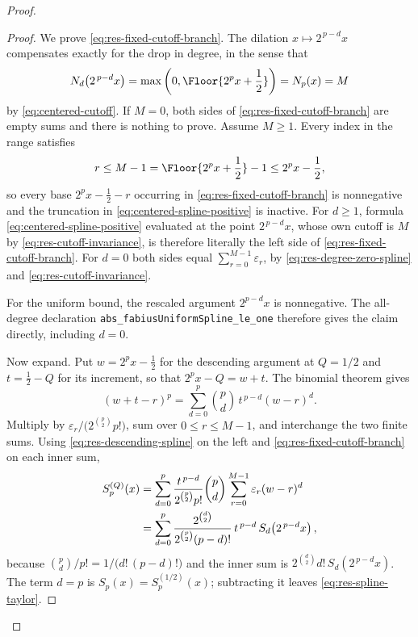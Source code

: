 \documentclass[11pt,oneside]{article}
\theoremstyle{definition}
\theoremstyle{remark}
\newcommand{\lean}[1]{%
  \ifmmode\text{\nolinkurl{#1}}\else\nolinkurl{#1}\fi}
\begin{document}
\begin{proof}
\begin{proof}
We prove \eqref{eq:res-fixed-cutoff-branch}.  The dilation $x\mapsto2^{\,p-d}x$ compensates
exactly for the drop in degree, in the sense that
\begin{equation}
 N_d\!\left(2^{\,p-d}x\right)
 =\max\left(0,\Floor{2^{p}x+\frac12}\right)
 =N_p(x)=M                                                \label{eq:res-cutoff-invariance}
\end{equation}
by \eqref{eq:centered-cutoff}.  If $M=0$, both sides of
\eqref{eq:res-fixed-cutoff-branch} are empty sums and there is nothing to prove.  Assume
$M\ge1$.  Every index in the range satisfies
\[
 r\le M-1=\Floor{2^px+\frac12}-1\le2^px-\frac12,
\]
so every base $2^px-\frac12-r$ occurring in \eqref{eq:res-fixed-cutoff-branch} is
nonnegative and the truncation in \eqref{eq:centered-spline-positive} is inactive.  For
$d\ge1$, formula \eqref{eq:centered-spline-positive} evaluated at the point $2^{\,p-d}x$,
whose own cutoff is $M$ by \eqref{eq:res-cutoff-invariance}, is therefore literally the left
side of \eqref{eq:res-fixed-cutoff-branch}.  For $d=0$ both sides equal
$\sum_{r=0}^{M-1}\varepsilon_r$, by \eqref{eq:res-degree-zero-spline} and
\eqref{eq:res-cutoff-invariance}.

For the uniform bound, the rescaled argument \(2^{p-d}x\) is nonnegative.
The all-degree declaration \lean{abs_fabiusUniformSpline_le_one} therefore gives the
claim directly, including \(d=0\).

Now expand.  Put $w=2^px-\frac12$ for the descending argument at $Q=1/2$ and
$t=\frac12-Q$ for its increment, so that $2^px-Q=w+t$.  The binomial theorem gives
\[
 (w+t-r)^{p}=\sum_{d=0}^{p}\binom pd\,t^{\,p-d}(w-r)^{d}.
\]
Multiply by $\varepsilon_r\bigl/\bigl(2^{\binom p2}p!\bigr)$, sum over $0\le r\le M-1$, and
interchange the two finite sums.  Using \eqref{eq:res-descending-spline} on the left and
\eqref{eq:res-fixed-cutoff-branch} on each inner sum,
\begin{align}
 S_p^{(Q)}(x)
 &=\sum_{d=0}^{p}\frac{t^{\,p-d}}{2^{\binom p2}p!}\binom pd
   \sum_{r=0}^{M-1}\varepsilon_r(w-r)^{d}                 \notag\\
 &=\sum_{d=0}^{p}\frac{2^{\binom d2}}{2^{\binom p2}(p-d)!}\,t^{\,p-d}\,
   S_d\!\left(2^{\,p-d}x\right),                          \label{eq:res-full-expansion}
\end{align}
because $\binom pd\bigl/p!=1\bigl/\bigl(d!\,(p-d)!\bigr)$ and the inner sum is
$2^{\binom d2}d!\,S_d(2^{\,p-d}x)$.  The term $d=p$ is $S_p(x)=S_p^{(1/2)}(x)$; subtracting
it leaves \eqref{eq:res-spline-taylor}.
\end{proof}


\end{proof}
\end{document}
